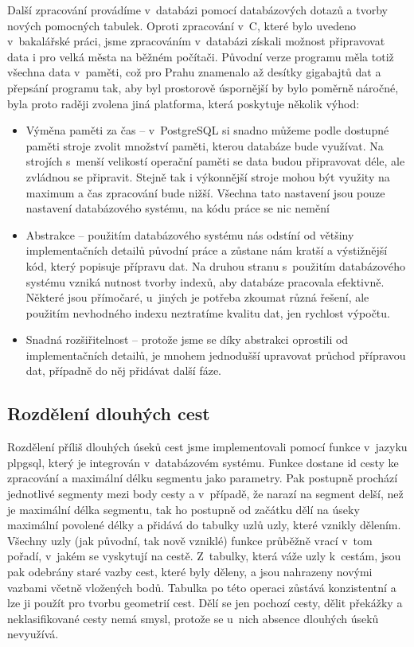 Další zpracování provádíme v~databázi pomocí databázových dotazů a tvorby nových
pomocných tabulek. Oproti zpracování v~C, které bylo uvedeno v~bakalářské práci,
jsme zpracováním v~databázi získali možnost připravovat data i pro velká města
na běžném počítači. Původní verze programu měla totiž všechna data v~paměti, což
pro Prahu znamenalo až desítky gigabajtů dat a přepsání programu tak, aby byl
prostorově úspornější by bylo poměrně náročné, byla proto raději zvolena jiná
platforma, která poskytuje několik výhod:
\begin{itemize}
	\item Výměna paměti za čas -- v~PostgreSQL si snadno můžeme podle
	dostupné paměti stroje zvolit množství paměti, kterou databáze bude
	využívat. Na strojích s~menší velikostí operační paměti se data budou
	připravovat déle, ale zvládnou se připravit. Stejně tak i výkonnější
	stroje mohou být využity na maximum a čas zpracování bude nižší. Všechna
	tato nastavení jsou pouze nastavení databázového systému, na kódu práce
	se nic nemění
	\item Abstrakce -- použitím databázového systému nás odstíní od většiny
	implementačních detailů původní práce a zůstane nám kratší a výstižnější
	kód, který popisuje přípravu dat. Na druhou stranu s~použitím
	databázového systému vzniká nutnost tvorby indexů, aby databáze
	pracovala efektivně. Některé jsou přímočaré, u~jiných je potřeba zkoumat
	různá řešení, ale použitím nevhodného indexu neztratíme kvalitu dat, jen
	rychlost výpočtu. 
	\item Snadná rozšiřitelnost -- protože jsme se díky abstrakci oprostili
	od implementačních detailů, je mnohem jednodušší upravovat průchod
	přípravou dat, případně do něj přidávat další fáze.
\end{itemize}

\subsection{Rozdělení dlouhých cest}
Rozdělení příliš dlouhých úseků cest jsme implementovali pomocí funkce v~jazyku
plpgsql, který je integrován v~databázovém systému. Funkce dostane id cesty ke
zpracování a maximální délku segmentu jako parametry. Pak postupně prochází
jednotlivé segmenty mezi body cesty a v~případě, že narazí na segment delší, než
je maximální délka segmentu, tak ho postupně od začátku dělí na úseky maximální
povolené délky a přidává do tabulky uzlů uzly, které vznikly dělením. Všechny
uzly (jak původní, tak nově vzniklé) funkce průběžně vrací v~tom pořadí, v~jakém
se vyskytují na cestě. Z~tabulky, která váže uzly k~cestám, jsou pak odebrány
staré vazby cest, které byly děleny, a jsou nahrazeny novými vazbami včetně
vložených bodů. Tabulka po této operaci zůstává konzistentní a lze ji použít pro
tvorbu geometrií cest. Dělí se jen pochozí cesty, dělit překážky a
neklasifikované cesty nemá smysl, protože se u~nich absence dlouhých úseků
nevyužívá.

